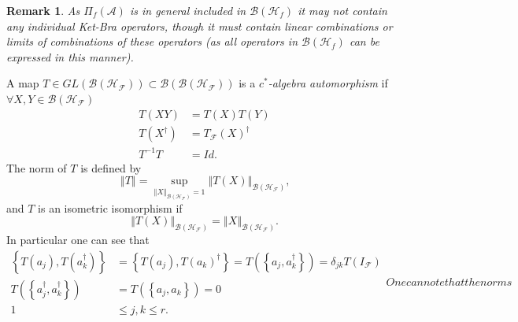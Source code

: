 \documentclass[aps, preprint]{revtex4}
\newtheorem{remark}[theorem]{Remark}
\begin{document}
\begin{remark}
As $\Pi _{f} \left (\mathcal{A}\right )$ is in general included in $\mathcal{B} \left (\mathcal{H}_{f}\right )$ it may \emph{not contain} any \emph{individual} Ket-Bra operators, though it must contain linear
combinations or limits of combinations of these operators (as all operators in $\mathcal{B} \left (\mathcal{H}_{f}\right )$ can be expressed in this manner). 
\end{remark}

A map $T \in G L \left (\mathcal{B} \left (\mathcal{H}_{\mathcal{F}}\right )\right ) \subset \mathcal{B} \left (\mathcal{B} \left (\mathcal{H}_{\mathcal{F}}\right )\right )$ is a $c^{ \ast }$\emph{-algebra automorphism} if $ \forall X ,Y \in \mathcal{B} \left (\mathcal{H}_{\mathcal{F}}\right )$
\begin{align}T \left (X Y\right ) &  =T \left (X\right ) T \left (Y\right ) \\
T \left (X^{ \dag }\right ) &  =T_{\mathcal{F}} \left (X\right )^{ \dag } \\
T^{ -1} T &  =I d\text{.}\end{align}The norm of $T$ is defined by
\begin{equation}\left \Vert T\right \Vert  =\sup_{\left \Vert X\right \Vert _{\mathcal{B} \left (\mathcal{H}_{\mathcal{F}}\right )} =1}\left \Vert T \left (X\right )\right \Vert _{\mathcal{B} \left (\mathcal{H}_{\mathcal{F}}\right )}\text{,}
\end{equation}and $T$ is an isometric isomorphism if
\begin{equation}\left \Vert T \left (X\right )\right \Vert _{\mathcal{B} \left (\mathcal{H}_{\mathcal{F}}\right )} =\left \Vert X\right \Vert _{\mathcal{B} \left (\mathcal{H}_{\mathcal{F}}\right )}\text{.}
\end{equation}In particular one can see that
\label{CAR}
\begin{subequations}
\begin{align}\left \{T \left (a_{j}\right ) ,T \left (a_{k}^{ \dag }\right )\right \} &  =\left \{T \left (a_{j}\right ) ,T \left (a_{k}\right )^{ \dag }\right \} =T \left (\left \{a_{j} ,a_{k}^{ \dag }\right \}\right ) =\delta _{j k} T \left (I_{\mathcal{F}}\right ) \\
T \left (\left \{a_{j}^{ \dag } ,a_{k}^{ \dag }\right \}\right ) &  =T \left (\left \{a_{j} ,a_{k}\right \}\right ) =0 \\
1 &  \leq j ,k \leq r\text{.}\end{align}One can note that the norms
\end{subequations}
\end{document}
